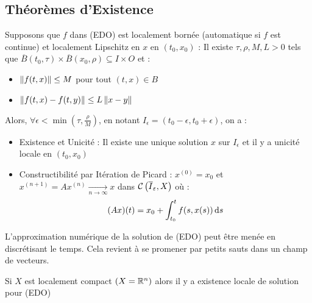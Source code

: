 \documentclass{cours}
\begin{document}
\subsection{Théorèmes d'Existence}
\begin{theorem}
    Supposons que $f$ dans (EDO) est localement bornée (automatique si $f$ est continue) et localement Lipschitz en $x$ en $(t_{0}, x_{0})$ : Il existe $\tau, \rho, M, L > 0$ tels que $\overline{B}(t_{0}, \tau) \times \overline{B}(x_{0}, \rho) \subseteq I \times O$ et :
    \begin{itemize}
        \item $\left\lVert f(t, x) \right\rVert \leq M$ pour tout $(t, x) \in B$
        \item $\left\lVert f(t, x) - f(t, y) \right\rVert \leq L\left\lVert x - y \right\rVert$
    \end{itemize}
    Alors, $\forall \epsilon < \min\left(\tau, \frac{\rho}{M}\right)$, en notant $I_{\epsilon} = \left(t_{0} - \epsilon, t_{0} + \epsilon\right)$, on a :
    \begin{itemize}
        \item Existence et Unicité : Il existe une unique solution $x$ sur $I_{\epsilon}$ et il y a unicité locale en $(t_{0}, x_{0})$
        \item Constructibilité par Itération de Picard : $x^{(0)} = x_{0}$ et $x^{(n+1)} = Ax^{(n)} \xrightarrow[n \to \infty]{} x$ dans $\mathcal{C}\left(\overline{I}_{\varepsilon}, X\right)$ où :
              \[
                  (Ax)(t) = x_{0} + \int_{t_{0}}^{t} f(s, x(s)){\rm \, d} s
              \]
    \end{itemize}
\end{theorem}

\begin{remark}
    L'approximation numérique de la solution de (EDO) peut être menée en discrétisant le temps. Cela revient à se promener par petits sauts dans un champ de vecteurs.
\end{remark}

\begin{theorem}[de Peano]
    Si $X$ est localement compact $(X = \mathbb{R}^{n})$ alors il y a existence locale de solution pour (EDO)
\end{theorem}
\end{document}

